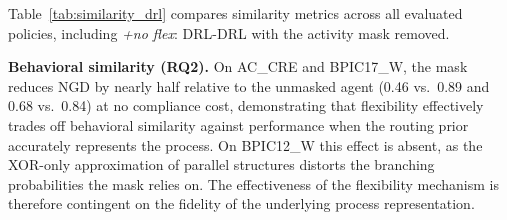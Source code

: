 \documentclass[journal,onecolumn]{IEEEtran}
\begin{document}
Table~\ref{tab:similarity_drl} compares similarity metrics across
all evaluated policies, including \textit{+no flex}: DRL-DRL with
the activity mask removed.

\noindent\textbf{Behavioral similarity (RQ2).}
On AC\_CRE and BPIC17\_W, the mask reduces NGD by nearly half
relative to the unmasked agent (0.46 vs.\ 0.89 and 0.68 vs.\
0.84) at no compliance cost, demonstrating that flexibility
effectively trades off behavioral similarity against performance
when the routing prior accurately represents the process. On
BPIC12\_W this effect is absent, as the XOR-only approximation
of parallel structures distorts the branching probabilities the
mask relies on. The effectiveness of the flexibility mechanism is
therefore contingent on the fidelity of the underlying process
representation.
\end{document}
